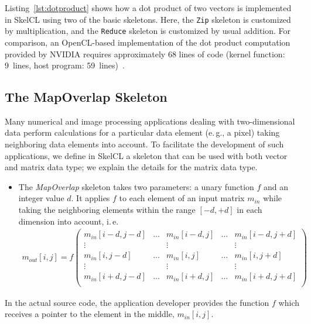 Listing~\ref{lst:dotproduct} shows how a dot product of two vectors is implemented in SkelCL using two of the basic skeletons.
Here, the \texttt{Zip} skeleton is customized by multiplication, and the \texttt{Reduce} skeleton is customized by usual addition.  
For comparison, an OpenCL-based implementation of the dot product computation provided by NVIDIA requires approximately 68 lines of code (kernel function: 9~lines, host program: 59~lines)~\cite{CUDASDK-10}.



\subsection{The MapOverlap Skeleton}
\label{sec:skelcl:mapoverlap}
Many numerical and image processing applications dealing with two-dimensional data perform calculations for a particular data element (e.\,g., a pixel) taking neighboring data elements into account.
To facilitate the development of such applications, we define in SkelCL a skeleton that can be used with both vector and matrix data type; we explain the details for the matrix data type.
\begin{itemize}
  \item The \emph{MapOverlap} skeleton takes two parameters: a unary function $f$ and an integer value $d$.
   It applies $f$ to each element of an input matrix $m_{in}$ while taking the neighboring elements within the range $[-d, +d]$ in each dimension into account, i.\,e.
  \begin{align*}
m_{out}[i,j]=f\left(
\begin{array}{ccccc}
m_{in}[i-d,j-d] & \hdots & m_{in}[i-d,j] & \hdots & m_{in}[i-d,j+d] \\
\vdots & ~ & \vdots & ~ & \vdots \\
m_{in}[i,j-d] & \hdots & m_{in}[i,j] & \hdots & m_{in}[i,j+d]\\
\vdots & ~ & \vdots & ~ & \vdots \\
m_{in}[i+d,j-d] & \hdots & m_{in}[i+d,j] & \hdots & m_{in}[i+d,j+d] \\
\end{array}
\right)
\end{align*}
\end{itemize}

In the actual source code, the application developer provides the function $f$ which receives a pointer to the element in the middle, $m_{in}[i,j]$.

